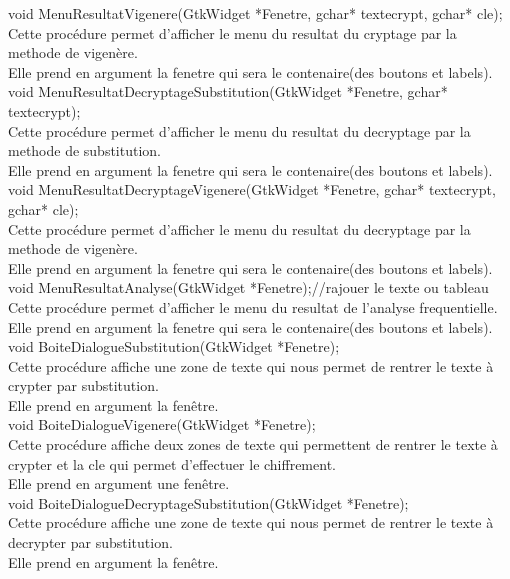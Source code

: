 \documentclass[a4]{article}
\begin{document}
	void MenuResultatVigenere(GtkWidget *Fenetre, gchar* textecrypt, gchar* cle);\\
		Cette procédure permet d'afficher le menu du resultat du cryptage par la methode de vigenère.\\
		Elle prend en argument la fenetre qui sera le contenaire(des boutons et labels).\\
		
	void MenuResultatDecryptageSubstitution(GtkWidget *Fenetre, gchar* textecrypt);\\
		Cette procédure permet d'afficher le menu du resultat du decryptage par la methode de substitution.\\
		Elle prend en argument la fenetre qui sera le contenaire(des boutons et labels).\\
	
	void MenuResultatDecryptageVigenere(GtkWidget *Fenetre, gchar* textecrypt, gchar* cle);\\
		Cette procédure permet d'afficher le menu du resultat du decryptage par la methode de vigenère.\\
		Elle prend en argument la fenetre qui sera le contenaire(des boutons et labels).\\
	
	void MenuResultatAnalyse(GtkWidget *Fenetre);//rajouer le texte ou tableau\\
		Cette procédure permet d'afficher le menu du resultat de l'analyse frequentielle.\\
		Elle prend en argument la fenetre qui sera le contenaire(des boutons et labels).\\
	
	void BoiteDialogueSubstitution(GtkWidget *Fenetre);\\
		Cette procédure affiche une zone de texte qui nous permet de rentrer le texte à crypter par substitution.\\
		Elle prend en argument la fenêtre.\\
	
	void BoiteDialogueVigenere(GtkWidget *Fenetre);\\
		Cette procédure affiche deux zones de texte qui permettent de rentrer le texte à crypter et la cle qui permet d'effectuer le chiffrement.\\
		Elle prend en argument une fenêtre.\\
		
	void BoiteDialogueDecryptageSubstitution(GtkWidget *Fenetre);\\
		Cette procédure affiche une zone de texte qui nous permet de rentrer le texte à decrypter par substitution.\\
		Elle prend en argument la fenêtre.\\
	
\end{document}
